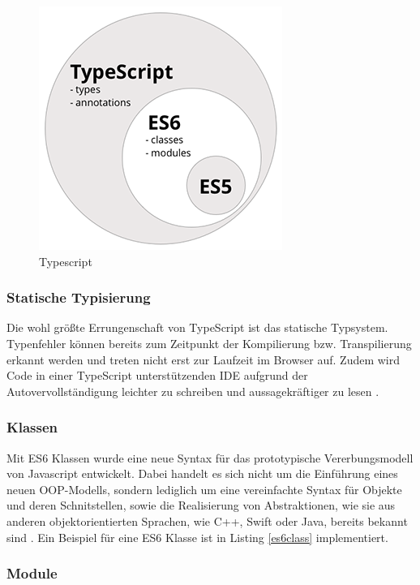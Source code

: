 \begin{figure}[ht]
 \centering
 \includegraphics[width=0.4\linewidth]{kapitel2/typescript----es5-es6-typescript-circle-diagram.png}
 \caption{Typescript \cite[152]{ng-Book-2}}
 \label{tsesgraph}
\end{figure}


\subsubsection{Statische Typisierung}

Die wohl größte Errungenschaft von TypeScript ist das statische Typsystem.
Typenfehler können bereits zum Zeitpunkt
der Kompilierung bzw. Transpilierung erkannt werden und treten nicht erst zur Laufzeit im Browser auf.
Zudem wird Code in einer TypeScript unterstützenden IDE aufgrund der Autovervollständigung
leichter zu schreiben und aussagekräftiger zu lesen \cite[156]{ng-Book-2}.

\subsubsection{Klassen}

Mit ES6 Klassen wurde eine neue Syntax für das prototypische Vererbungsmodell von Javascript entwickelt.
Dabei handelt es sich nicht um die Einführung eines neuen OOP-Modells, sondern lediglich um eine vereinfachte Syntax für Objekte und deren Schnitstellen,
sowie die Realisierung von Abstraktionen, wie sie aus anderen objektorientierten Sprachen, wie C++, Swift oder Java, bereits bekannt sind \cite{js-Klassen}.
Ein Beispiel für eine ES6 Klasse ist in Listing \ref{es6class} implementiert.

\vspace{0.3cm}


\subsubsection{Module}

